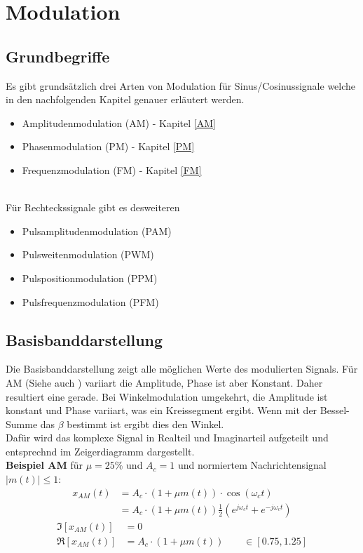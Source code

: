 \section{Modulation}
\subsection{Grundbegriffe}
Es gibt grundsätzlich drei Arten von Modulation für Sinus/Cosinussignale welche in den nachfolgenden Kapitel genauer erläutert werden.
\begin{itemize}[nosep]
	\item Amplitudenmodulation (AM) - Kapitel \ref{AM}
	\item Phasenmodulation (PM) - Kapitel \ref{PM}
	\item Frequenzmodulation (FM) - Kapitel \ref{FM}
\end{itemize}
~\\
\noindent Für Rechteckssignale gibt es desweiteren 
\begin{itemize}[nosep]
	\item Pulsamplitudenmodulation (PAM)
	\item Pulsweitenmodulation (PWM)
	\item Pulspositionmodulation (PPM)
	\item Pulsfrequenzmodulation (PFM)
\end{itemize}

\subsection{Basisbanddarstellung}
Die Basisbanddarstellung zeigt alle möglichen Werte des modulierten Signals. Für AM (Siehe auch ) variiart die Amplitude, Phase ist aber Konstant. Daher resultiert eine gerade. Bei Winkelmodulation umgekehrt, die Amplitude ist konstant und Phase variiart, was ein Kreissegment ergibt. Wenn mit der Bessel-Summe das $\beta$ bestimmt ist ergibt dies den Winkel.
~\\
Dafür wird das komplexe Signal in Realteil und Imaginarteil aufgeteilt und entsprechnd im Zeigerdiagramm dargestellt.~\\

\noindent\textbf{Beispiel AM} für $\mu = 25\%$ und $A_c=1$ und normiertem Nachrichtensignal $|m(t)| \leq 1$:
\begin{align*}
	x_{AM}(t) &= A_c \cdot (1 + \mu m(t)) \cdot \cos(\omega_ct) \\
	&= A_c \cdot (1 + \mu m(t)) \frac{1}{2}(e^{j\omega_ct} + e^{-j\omega_ct})
\end{align*}
\begin{align*}
	\Im[x_{AM}(t)] &= 0\\
	\Re[x_{AM}(t)] &=  A_c \cdot (1 + \mu m(t))\qquad \in [0.75, 1.25]
\end{align*}


